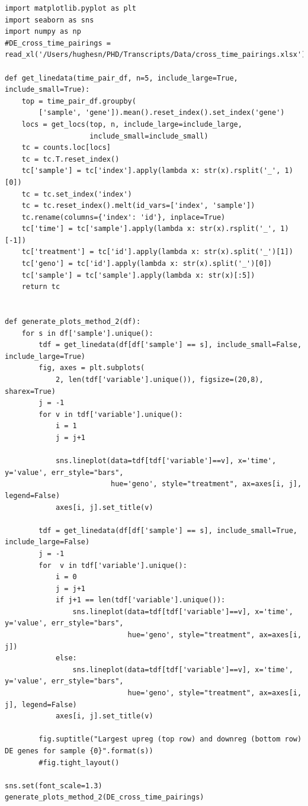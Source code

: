 \documentclass[11pt]{article}
\begin{document}
\begin{verbatim}
import matplotlib.pyplot as plt
import seaborn as sns
import numpy as np
#DE_cross_time_pairings = read_xl('/Users/hughesn/PHD/Transcripts/Data/cross_time_pairings.xlsx')

def get_linedata(time_pair_df, n=5, include_large=True, include_small=True):
    top = time_pair_df.groupby(
        ['sample', 'gene']).mean().reset_index().set_index('gene')
    locs = get_locs(top, n, include_large=include_large,
                    include_small=include_small)
    tc = counts.loc[locs]
    tc = tc.T.reset_index()
    tc['sample'] = tc['index'].apply(lambda x: str(x).rsplit('_', 1)[0])
    tc = tc.set_index('index')
    tc = tc.reset_index().melt(id_vars=['index', 'sample'])
    tc.rename(columns={'index': 'id'}, inplace=True)
    tc['time'] = tc['sample'].apply(lambda x: str(x).rsplit('_', 1)[-1])
    tc['treatment'] = tc['id'].apply(lambda x: str(x).split('_')[1])
    tc['geno'] = tc['id'].apply(lambda x: str(x).split('_')[0])
    tc['sample'] = tc['sample'].apply(lambda x: str(x)[:5])
    return tc


def generate_plots_method_2(df):
    for s in df['sample'].unique():
        tdf = get_linedata(df[df['sample'] == s], include_small=False, include_large=True)
        fig, axes = plt.subplots(
            2, len(tdf['variable'].unique()), figsize=(20,8), sharex=True)
        j = -1
        for v in tdf['variable'].unique():
            i = 1
            j = j+1

            sns.lineplot(data=tdf[tdf['variable']==v], x='time', y='value', err_style="bars",
                         hue='geno', style="treatment", ax=axes[i, j], legend=False)
            axes[i, j].set_title(v)

        tdf = get_linedata(df[df['sample'] == s], include_small=True, include_large=False)
        j = -1
        for  v in tdf['variable'].unique():
            i = 0
            j = j+1
            if j+1 == len(tdf['variable'].unique()):
                sns.lineplot(data=tdf[tdf['variable']==v], x='time', y='value', err_style="bars",
                             hue='geno', style="treatment", ax=axes[i, j])
            else:
                sns.lineplot(data=tdf[tdf['variable']==v], x='time', y='value', err_style="bars",
                             hue='geno', style="treatment", ax=axes[i, j], legend=False)
            axes[i, j].set_title(v)

        fig.suptitle("Largest upreg (top row) and downreg (bottom row) DE genes for sample {0}".format(s))
        #fig.tight_layout()

sns.set(font_scale=1.3)
generate_plots_method_2(DE_cross_time_pairings)
\end{verbatim}
\end{document}
